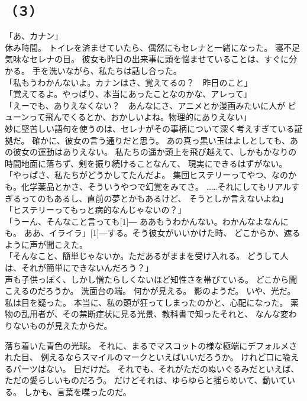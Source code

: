 \documentclass[../IHMain]{subfiles}
\begin{document}
\subsection*{（３）}
「あ、カナン」\\
休み時間。
トイレを済ませていたら、偶然にもセレナと一緒になった。
寝不足気味なセレナの目。
彼女も昨日の出来事に頭を悩ませていることは、すぐに分かる。
手を洗いながら、私たちは話し合った。\\
「私もうわかんないよ。カナンはさ、覚えてるの？　昨日のこと」\\
「覚えてるよ。やっぱり、本当にあったことなのかな、アレって」\\
「えーでも、ありえなくない？　あんなにさ、アニメとか漫画みたいに人が
ビューンって飛んでくるとか、おかしいよね。物理的にありえない」\\
妙に堅苦しい語句を使うのは、セレナがその事柄について深く考えすぎている証拠だ。
確かに、彼女の言う通りだと思う。
あの真っ黒い玉はよしとしても、あの彼女の運動はありえない。
私たちの遥か頭上を飛び越えて、しかもかなりの時間地面に落ちず、剣を振り続けることなんて、
現実にできるはずがない。\\
「やっぱさ、私たちがどうかしてたんだよ。
集団ヒステリーってやつ、なのかも。化学薬品とかさ、そういうやつで幻覚をみてさ。
……それにしてもリアルすぎるってのもあるし、直前の夢とかもあるけど、
そうとしか言えないよね」\\
「ヒステリーってもっと病的なんじゃないの？」\\
「うーん、そんなこと言っても\scalebox{3}[1]{―}
ああもうわかんない。わかんなよなんにも。
ああ、イライラ」\scalebox{3}[1]{―}する。そう彼女がいいかけた時、
どこからか、遮るように声が聞こえた。\\
「そんなこと、簡単じゃないか。ただあるがままを受け入れる。
どうして人は、それが簡単にできないんだろう？」\\
声も子供っぽく、しかし憎たらしくないほど知性さを帯びている。
どこから聞こえるのだろうか。
洗面台の端。
何かが見える。
影のようだ。
いや、光だ。
私は目を疑った。
本当に、私の頭が狂ってしまったのかと、心配になった。
薬物の乱用者が、その禁断症状に見る光景、教科書で知ったそれと、
なんな変わりないものが見えたからだ。

落ち着いた青色の光球。
それに、まるでマスコットの様な極端にデフォルメされた目、
例えるならスマイルのマークといえばいいだろうか。
けれど口に喩えるパーツはない。
目だけだ。
それでも、それがただのぬいぐるみだといえば、ただの愛らしいものだろう。
だけどそれは、ゆらゆらと揺らめいて、動いている。
しかも、言葉を喋ったのだ。
\end{document}
